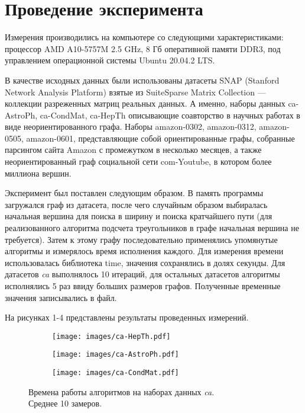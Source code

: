 \section{Проведение эксперимента}

Измерения производились на компьютере со следующими характеристиками: процессор AMD A10-5757M 2.5 GHz, 8 Гб оперативной памяти 
DDR3, под управлением операционной системы Ubuntu 20.04.2 LTS.

В качестве исходных данных были использованы датасеты SNAP (Stanford Network Analysis Platform\cite{snap}) взятые из SuiteSparse 
Matrix Collection --- коллекции разреженных матриц реальных данных\cite{suitesparse-research}. А именно, наборы данных 
ca-AstroPh\cite{suitesparse-data}, ca-CondMat, ca-HepTh описывающие соавторство в научных работах в виде неориентированного графа. 
Наборы amazon-0302, amazon-0312, amazon-0505, amazon-0601, представляющие собой ориентированные графы, собранные парсингом сайта 
Amazon с промежутком в несколько месяцев, а также неориентированный граф социальной сети com-Youtube, в котором более миллиона вершин.

Эксперимент был поставлен следующим образом. В память программы загружался граф из датасета, после чего случайным образом выбиралась 
начальная вершина для поиска в ширину и поиска кратчайшего пути (для реализованного алгоритма подсчета треугольников в графе начальная 
вершина не требуется). Затем к этому графу последовательно применялись упомянутые алгоритмы и измерялось время исполнения каждого. 
Для измерения времени использовалась библиотека time, значения сохранялись в долях секунды. Для датасетов \textit{ca} выполнялось 
10 итераций, для остальных датасетов алгоритмы исполнялись 5 раз ввиду больших размеров графов. Полученные временные значения 
записывались в файл.

На рисунках 1-4 представлены результаты проведенных измерений.

\begin{figure}[htp]
\centering
    \begin{subfigure}{0.5\textwidth}
        \texttt{[image: images/ca-HepTh.pdf]}
    \end{subfigure}\hfill
    \begin{subfigure}{0.5\textwidth}
        \texttt{[image: images/ca-AstroPh.pdf]}
    \end{subfigure}\par
    \begin{subfigure}{0.5\textwidth}
        \texttt{[image: images/ca-CondMat.pdf]}
    \end{subfigure}\hfill
\caption{Времена работы алгоритмов на наборах данных \textit{ca}.\\Среднее 10 замеров.}
\end{figure}

